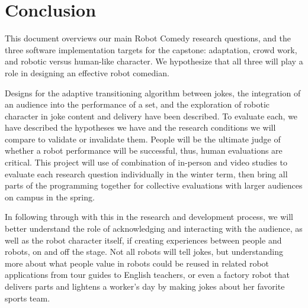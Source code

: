 \section{Conclusion}
This document overviews our main Robot Comedy research questions, and the three software implementation targets
for the capstone: adaptation, crowd work, and robotic versus human-like character. We hypothesize that all three will
play a role in designing an effective robot comedian.

Designs for the adaptive transitioning algorithm between jokes, the integration of an audience into the performance
of a set, and the exploration of robotic character in joke content and delivery have been described. To evaluate each,
we have described the hypotheses we have and the research conditions we will compare to validate or invalidate them.
People will be the ultimate judge of whether a robot performance will be successful, thus, human evaluations are critical.
This project will use of combination of in-person and video studies to evaluate each research question individually in
the winter term, then bring all parts of the programming together for collective evaluations with larger audiences on
campus in the spring.

In following through with this in the research and development process, we will better understand the role of
acknowledging and interacting with the audience, as well as the robot character itself, if creating experiences between
people and robots, on and off the stage. Not all robots will tell jokes, but understanding more about what people value
in robots could be reused in related robot applications from tour guides to English teachers, or even a factory robot that
delivers parts and lightens a worker’s day by making jokes about her favorite sports team.
